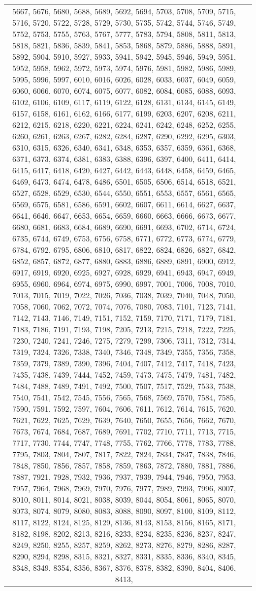 \documentclass[12pt]{article}
\begin{document}
\begin{tabular}{|c|p{15cm}|}
5667, 5676, 5680, 5688, 5689, 5692, 5694, 5703, 5708, 5709, 5715, 5716, 5720, 5722, 5728, 5729, 5730, 5735, 5742, 5744, 5746, 5749, 5752, 5753, 5755, 5763, 5767, 5777, 5783, 5794, 5808, 5811, 5813, 5818, 5821, 5836, 5839, 5841, 5853, 5868, 5879, 5886, 5888, 5891, 5892, 5904, 5910, 5927, 5933, 5941, 5942, 5945, 5946, 5949, 5951, 5952, 5958, 5962, 5972, 5973, 5974, 5976, 5981, 5982, 5986, 5989, 5995, 5996, 5997, 6010, 6016, 6026, 6028, 6033, 6037, 6049, 6059, 6060, 6066, 6070, 6074, 6075, 6077, 6082, 6084, 6085, 6088, 6093, 6102, 6106, 6109, 6117, 6119, 6122, 6128, 6131, 6134, 6145, 6149, 6157, 6158, 6161, 6162, 6166, 6177, 6199, 6203, 6207, 6208, 6211, 6212, 6215, 6218, 6220, 6221, 6224, 6241, 6242, 6248, 6252, 6255, 6260, 6261, 6263, 6267, 6282, 6284, 6287, 6290, 6292, 6295, 6303, 6310, 6315, 6326, 6340, 6341, 6348, 6353, 6357, 6359, 6361, 6368, 6371, 6373, 6374, 6381, 6383, 6388, 6396, 6397, 6400, 6411, 6414, 6415, 6417, 6418, 6420, 6427, 6442, 6443, 6448, 6458, 6459, 6465, 6469, 6473, 6474, 6478, 6486, 6501, 6505, 6506, 6514, 6518, 6521, 6527, 6528, 6529, 6530, 6544, 6550, 6551, 6553, 6557, 6561, 6565, 6569, 6575, 6581, 6586, 6591, 6602, 6607, 6611, 6614, 6627, 6637, 6641, 6646, 6647, 6653, 6654, 6659, 6660, 6663, 6666, 6673, 6677, 6680, 6681, 6683, 6684, 6689, 6690, 6691, 6693, 6702, 6714, 6724, 6735, 6744, 6749, 6753, 6756, 6758, 6771, 6772, 6773, 6774, 6779, 6784, 6792, 6795, 6806, 6810, 6817, 6822, 6824, 6826, 6827, 6842, 6852, 6857, 6872, 6877, 6880, 6883, 6886, 6889, 6891, 6900, 6912, 6917, 6919, 6920, 6925, 6927, 6928, 6929, 6941, 6943, 6947, 6949, 6955, 6960, 6964, 6974, 6975, 6990, 6997, 7001, 7006, 7008, 7010, 7013, 7015, 7019, 7022, 7026, 7036, 7038, 7039, 7040, 7048, 7050, 7058, 7060, 7062, 7072, 7074, 7076, 7080, 7083, 7101, 7123, 7141, 7142, 7143, 7146, 7149, 7151, 7152, 7159, 7170, 7171, 7179, 7181, 7183, 7186, 7191, 7193, 7198, 7205, 7213, 7215, 7218, 7222, 7225, 7230, 7240, 7241, 7246, 7275, 7279, 7299, 7306, 7311, 7312, 7314, 7319, 7324, 7326, 7338, 7340, 7346, 7348, 7349, 7355, 7356, 7358, 7359, 7379, 7389, 7390, 7396, 7404, 7407, 7412, 7417, 7418, 7423, 7435, 7438, 7439, 7444, 7452, 7459, 7473, 7475, 7479, 7481, 7482, 7484, 7488, 7489, 7491, 7492, 7500, 7507, 7517, 7529, 7533, 7538, 7540, 7541, 7542, 7545, 7556, 7565, 7568, 7569, 7570, 7584, 7585, 7590, 7591, 7592, 7597, 7604, 7606, 7611, 7612, 7614, 7615, 7620, 7621, 7622, 7625, 7629, 7639, 7640, 7650, 7655, 7656, 7662, 7670, 7673, 7674, 7684, 7687, 7689, 7691, 7702, 7710, 7711, 7713, 7715, 7717, 7730, 7744, 7747, 7748, 7755, 7762, 7766, 7778, 7783, 7788, 7795, 7803, 7804, 7807, 7817, 7822, 7824, 7834, 7837, 7838, 7846, 7848, 7850, 7856, 7857, 7858, 7859, 7863, 7872, 7880, 7881, 7886, 7887, 7921, 7928, 7932, 7936, 7937, 7939, 7944, 7946, 7950, 7953, 7957, 7964, 7968, 7969, 7970, 7976, 7977, 7989, 7993, 7996, 8007, 8010, 8011, 8014, 8021, 8038, 8039, 8044, 8054, 8061, 8065, 8070, 8073, 8074, 8079, 8080, 8083, 8088, 8090, 8097, 8100, 8109, 8112, 8117, 8122, 8124, 8125, 8129, 8136, 8143, 8153, 8156, 8165, 8171, 8182, 8198, 8202, 8213, 8216, 8233, 8234, 8235, 8236, 8237, 8247, 8249, 8250, 8255, 8257, 8259, 8262, 8273, 8276, 8279, 8286, 8287, 8290, 8294, 8298, 8315, 8321, 8327, 8331, 8335, 8336, 8340, 8345, 8348, 8349, 8354, 8356, 8367, 8376, 8378, 8382, 8390, 8404, 8406, 8413, 
\end{tabular}
\end{document}
